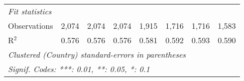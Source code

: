 \begin{tabular}{lccccccc}
   \midrule \emph{Fit statistics}\\
   Observations                                                                   & 2,074        & 2,074        & 2,074        & 1,915        & 1,716        & 1,716        & 1,583\\  
   R$^2$                                                                          & 0.576        & 0.576        & 0.576        & 0.581        & 0.592        & 0.593        & 0.590\\  
   \midrule
   \multicolumn{8}{l}{\emph{Clustered (Country) standard-errors in parentheses}}\\
   \multicolumn{8}{l}{\emph{Signif. Codes: ***: 0.01, **: 0.05, *: 0.1}}\\
\end{tabular}
\par\endgroup


